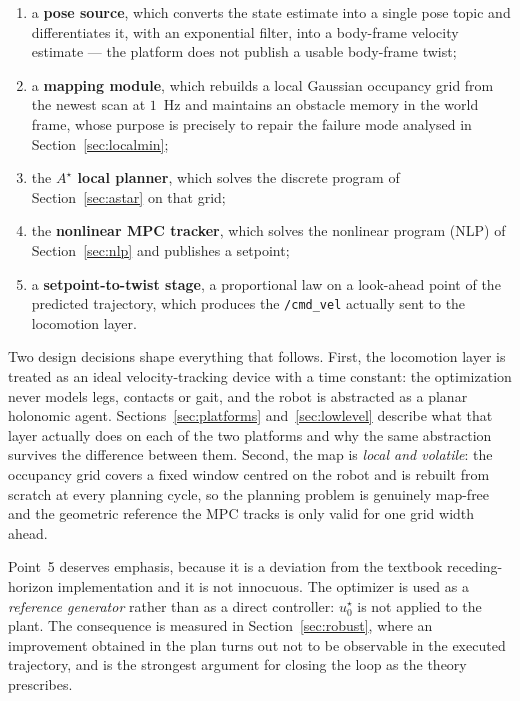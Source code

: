 \documentclass[11pt,a4paper]{article}
\newcommand{\astar}{$A^\star$}
\begin{document}
\begin{enumerate}[label=\arabic*.]
  \item a \textbf{pose source}, which converts the state estimate into a single pose topic and differentiates
        it, with an exponential filter, into a body-frame velocity estimate --- the platform does not publish
        a usable body-frame twist;
  \item a \textbf{mapping module}, which rebuilds a local Gaussian occupancy grid from the newest scan at
        $1$~Hz and maintains an obstacle memory in the world frame, whose purpose is precisely to repair the
        failure mode analysed in Section~\ref{sec:localmin};
  \item the \textbf{\astar{} local planner}, which solves the discrete program of Section~\ref{sec:astar} on
        that grid;
  \item the \textbf{nonlinear MPC tracker}, which solves the nonlinear program (NLP) of Section~\ref{sec:nlp} and publishes a
        setpoint;
  \item a \textbf{setpoint-to-twist stage}, a proportional law on a look-ahead point of the predicted
        trajectory, which produces the \texttt{/cmd\_vel} actually sent to the locomotion layer.
\end{enumerate}

Two design decisions shape everything that follows. First, the locomotion layer is treated as an ideal
velocity-tracking device with a time constant: the optimization never models legs, contacts or gait, and the
robot is abstracted as a planar holonomic agent. Sections~\ref{sec:platforms} and~\ref{sec:lowlevel} describe
what that layer actually does on each of the two platforms and why the same abstraction survives the
difference between them. Second, the map is \emph{local and volatile}: the occupancy grid covers a fixed
window centred on the robot and is rebuilt from scratch at every planning cycle, so the planning problem is
genuinely map-free and the geometric reference the MPC tracks is only valid for one grid width ahead.

Point~5 deserves emphasis, because it is a deviation from the textbook receding-horizon implementation and it
is not innocuous. The optimizer is used as a \emph{reference generator} rather than as a direct controller:
$u^\star_0$ is not applied to the plant. The consequence is measured in Section~\ref{sec:robust}, where an
improvement obtained in the plan turns out not to be observable in the executed trajectory, and is the
strongest argument for closing the loop as the theory prescribes.
\end{document}

